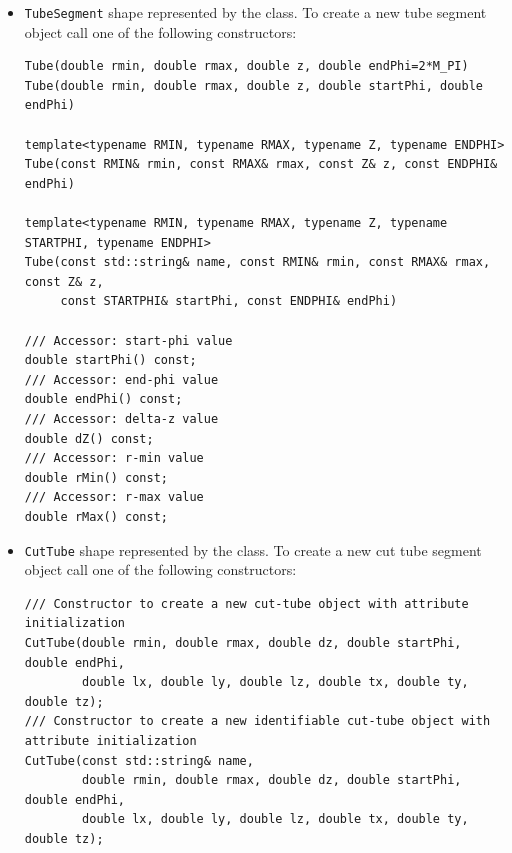 \begin{itemize}
\begin{verbatim}
/// Accessor: start-phi value
double startPhi() const;
/// Accessor: delta-phi value
double deltaPhi() const;
/// Accessor: z value
double z(int which) const;
/// Accessor: r-min value  
double rMin(int which) const;
/// Accessor: r-max value
double rMax(int which) const;
/// Accessor: vector of z-values for Z-planes value
std::vector<double> zPlaneZ() const;
/// Accessor: vector of rMin-values for Z-planes value
std::vector<double> zPlaneRmin() const;
/// Accessor: vector of rMax-values for Z-planes value
std::vector<double> zPlaneRmax() const;
\end{verbatim}

\item \texttt{TubeSegment} shape represented by the  class. To create a new tube segment object call one of the following constructors:
\begin{verbatim}
Tube(double rmin, double rmax, double z, double endPhi=2*M_PI)
Tube(double rmin, double rmax, double z, double startPhi, double endPhi)

template<typename RMIN, typename RMAX, typename Z, typename ENDPHI>
Tube(const RMIN& rmin, const RMAX& rmax, const Z& z, const ENDPHI& endPhi)  

template<typename RMIN, typename RMAX, typename Z, typename STARTPHI, typename ENDPHI>
Tube(const std::string& name, const RMIN& rmin, const RMAX& rmax, const Z& z, 
     const STARTPHI& startPhi, const ENDPHI& endPhi)  

/// Accessor: start-phi value
double startPhi() const;
/// Accessor: end-phi value
double endPhi() const;
/// Accessor: delta-z value
double dZ() const;
/// Accessor: r-min value
double rMin() const;
/// Accessor: r-max value
double rMax() const;
\end{verbatim}

\item \texttt{CutTube} shape represented by the  class.
To create a new cut tube segment object call one of the following constructors:
\begin{verbatim}
/// Constructor to create a new cut-tube object with attribute initialization
CutTube(double rmin, double rmax, double dz, double startPhi, double endPhi,
        double lx, double ly, double lz, double tx, double ty, double tz);
/// Constructor to create a new identifiable cut-tube object with attribute initialization
CutTube(const std::string& name,
        double rmin, double rmax, double dz, double startPhi, double endPhi,
        double lx, double ly, double lz, double tx, double ty, double tz);


\end{verbatim}
\end{itemize}

